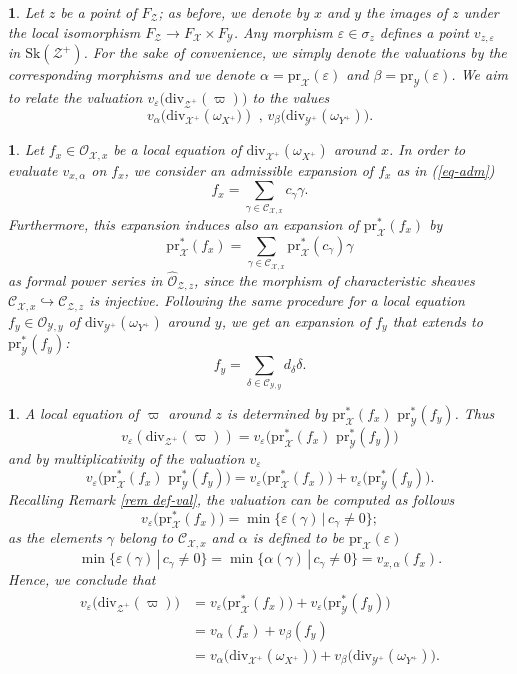 \documentclass{amsart}%
\numberwithin{equation}{subsection}
\theoremstyle{plain2}
\theoremstyle{definition2}
\theoremstyle{stepstyle}
\theoremstyle{point}
\theoremstyle{subpoint}
\newtheorem{subpoint}[equation]{}%
\newcommand{\spa}[1]{\begin{subpoint}#1\end{subpoint}}           %
\newcommand{\cX}{\ensuremath{\mathscr{X}}}
\newcommand{\caC}{\ensuremath{\mathcal{C}}}
\newcommand{\caO}{\ensuremath{\mathcal{O}}}
\newcommand{\cY}{\ensuremath{\mathscr{Y}}}
\newcommand{\cZ}{\ensuremath{\mathscr{Z}}}
\renewcommand{\cZ}{\ensuremath{\mathscr{Z}}}
\renewcommand{\cY}{\ensuremath{\mathscr{Y}}}
\newcommand{\pr}{\mathrm{pr}}
\newcommand{\divisor}{\mathrm{div}}
\newcommand{\Sk}{\mathrm{Sk}}
\begin{document}
\spa{Let $z$ be a point of $F_{\cZ}$; as before, we denote by $x$ and $y$ the images of $z$ under the local isomorphism $F_{\cZ} \rightarrow F_{\cX} \times F_{\cY}$. Any morphism $\varepsilon \in \sigma_z$ defines a point $v_{z,\varepsilon}$ in $\Sk(\cZ^+)$. For the sake of convenience, we simply denote the valuations by the corresponding morphisms and we denote $\alpha= \pr_{\cX}(\varepsilon)$ and $\beta=\pr_{\cY}(\varepsilon)$. We aim to relate the valuation $v_{\varepsilon}\big(\divisor_{\cZ^+}(\varpi)\big)$ to the values $$v_{\alpha}\big(\divisor_{\cX^+}(\omega_{X^+}\big)) \text{ , } v_{\beta}\big(\divisor_{\cY^+}(\omega_{Y^+})\big).$$}

\spa{Let $f_x \in \caO_{\cX,x}$ be a local equation of $\divisor_{\cX^+}(\omega_{X^+})$ around $x$. In order to evaluate $v_{x,\alpha}$ on $f_x$, we consider an admissible expansion of $f_x$ as in (\ref{eq-adm}) $$f_x=\sum_{\gamma\in \caC_{\cX,x}}c_\gamma \gamma.$$ Furthermore, this expansion induces also an expansion of $\pr_{\cX}^*(f_x)$ by  $$\pr_{\cX}^*(f_x)=\sum_{\gamma\in \caC_{\cX,x} }\pr^*_{\cX}(c_\gamma) \gamma$$ as formal power series in $\widehat{\caO}_{\cZ,z}$, since the morphism of characteristic sheaves $\mathcal{C}_{\cX,x} \hookrightarrow \mathcal{C}_{\cZ,z}$ is injective. Following the same procedure for a local equation $f_y \in \caO_{\cY,y}$ of $\divisor_{\cY^+}(\omega_{Y^+})$ around $y$, we get an expansion of $f_y$ that extends to $\pr_{\cY}^*(f_y)$: 
$$f_y=\sum_{\delta\in \caC_{\cY,y}}d_\delta \delta.$$}

\spa{A local equation of $\varpi$ around $z$ is determined by $\pr_{\cX}^*(f_x)\,\,\pr_{\cY}^*(f_y)$. Thus $$v_{\varepsilon}(\divisor_{\cZ^+}(\varpi))
= v_{\varepsilon}\big(\pr_{\cX}^*(f_x) \,\,\pr_{\cY}^*(f_y)\big)$$ and by multiplicativity of the valuation $v_{\varepsilon}$ $$v_{\varepsilon}\big(\pr_{\cX}^*(f_x) \,\,\pr_{\cY}^*(f_y)\big) = v_{\varepsilon}\big(\pr_{\cX}^*(f_x)\big) + v_{\varepsilon}\big(\pr_{\cY}^*(f_y)\big).$$ Recalling Remark \ref{rem def-val}, the valuation can be computed as follows $$ v_{\varepsilon}\big(\pr_{\cX}^*(f_x)\big) = \min\{\varepsilon(\gamma)\,|\,c_\gamma \neq 0\};$$ as the elements $\gamma$ belong to $\caC_{\cX,x}$ and $\alpha$ is defined to be $\pr_{\cX}(\varepsilon)$ $$\min\{\varepsilon(\gamma)\,|\,c_\gamma \neq 0\} = \min\{\alpha(\gamma)\,|\,c_\gamma \neq 0\} =  v_{x,\alpha}(f_x).$$ Hence, we conclude that \begin{align*}
v_{\varepsilon}\big(\divisor_{\cZ^+}(\varpi)\big)
& = v_{\varepsilon}\big(\pr_{\cX}^*(f_x)\big) + v_{\varepsilon}\big(\pr_{\cY}^*(f_y)\big)\\
& = v_{\alpha}(f_x) + v_{\beta}(f_y) \\
& = v_{\alpha}\big(\divisor_{\cX^+}(\omega_{X^+})\big) + v_{\beta}\big(\divisor_{\cY^+}(\omega_{Y^+})\big).
\end{align*}
}
\end{document}
